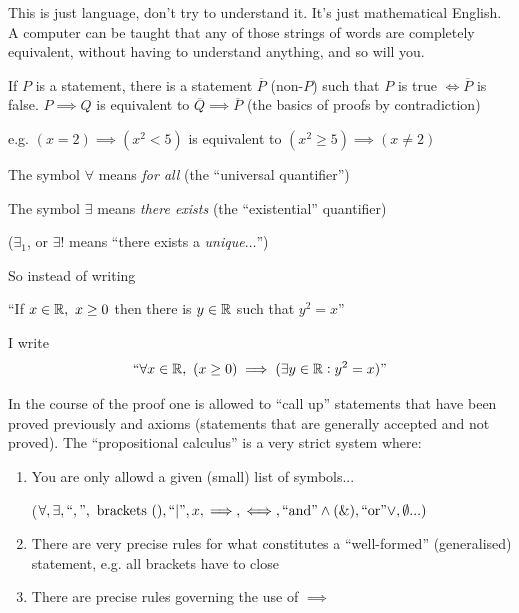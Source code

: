 \documentclass[10pt]{scrartcl}
\begin{document}
This is just language, don't try to understand it. It's just mathematical English. A computer can be taught that any of those strings of words are completely equivalent, without having to understand anything, and so will you. 


If $P$ is a statement, there is a statement $\overline{P}$ (non-$P$) such that $P$ is true $\iff \overline{P}$ is false. $P \implies Q$ is equivalent to $\overline{Q} \implies \overline{P}$ (the basics of proofs by contradiction) 

e.g. $(x=2) \implies (x^2 < 5)$ is equivalent to $(x^2\geq 5) \implies (x \neq 2)$\\


\vspace*{8pt}
\begin{definition} The symbol $\forall$ means \emph{for all} (the ``universal quantifier'')

The symbol $\exists$ means \emph{there exists} (the ``existential'' quantifier)

($\exists_1$, or $\exists!$ means ``there exists a \emph{unique}$\dots$'')
\end{definition}


So instead of writing 
\begin{center}
``If $x \in\mathbb{R},~x\geq 0$ then there is $y\in\mathbb{R}$ such that $y^2 = x$''
\end{center}
I write 
\[``\forall x \in\mathbb{R},~(x\geq 0) \implies (\exists y\in\mathbb{R}: y^2 = x)"\]

In the course of the proof one is allowed to ``call up'' statements that have been proved previously and axioms (statements that are generally accepted and not proved). The ``propositional calculus'' is a very strict system where:

\begin{enumerate}
\item You are only allowd a given (small) list of symbols...

($\forall, \exists, ``,", \mbox{ brackets } (), ``|", x, \implies, \iff, ``\text{and}" \wedge (\text{\&}),``\text{or}" \vee, \emptyset...)$

\item There are very precise rules for what constitutes a ``well-formed'' (generalised) statement, e.g. all brackets have to close

\item There are precise rules governing the use of $\implies$

\end{enumerate}
\vspace*{15pt}
\end{document}
